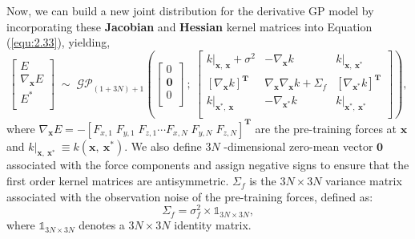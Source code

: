 Now, we can build a new joint distribution for the derivative GP model by incorporating these \textbf{Jacobian} and \textbf{Hessian} kernel matrices into Equation (\ref{equ:2.33}), yielding,
\begin{equation}
    \label{equ:2.41}
         \begin{bmatrix}
         E\\
         \nabla_{\mathbf{x}} E\\
         E^{*}\\
         \end{bmatrix}
        \;\mathtt{\sim}\;
        \mathcal{GP}_{(1+3N)+1}\left(
        \begin{bmatrix}
         0\\
         \mathbf{0}\\
         0\\
         \end{bmatrix}\:
         ;\:\begin{bmatrix}
             k|_{\mathbf{x},\:\mathbf{x}}+\sigma^{2} & -\nabla_{\mathbf{x}} k & k|_{\mathbf{x},\:\mathbf{x}^{*}}\\
             \left[\nabla_{\mathbf{x}} k\right]^{\textbf{T}}  & \nabla_{\mathbf{x}}\nabla_{\mathbf{x}} k +\Sigma_{f}& \left[\nabla_{\mathbf{x}^{*}} k\right]^{\textbf{T}} \\
             k|_{\mathbf{x}^{*},\:\mathbf{x}} & -\nabla_{\mathbf{x}^{*}} k & k|_{\mathbf{x}^{*},\:\mathbf{x}^{*}}\\
         \end{bmatrix}\right),
\end{equation}  
where $\nabla_{\mathbf{x}} E = -\left[F_{x,1}\;F_{y,1}\;F_{z,1}\cdots F_{x,N}\;F_{y,N}\;F_{z,N} \right]^{\mathbf{T}}$ are the pre-training forces at $\mathbf{x}$ and $k|_{\mathbf{x},\:\mathbf{x}^{*}} ~\equiv k(\mathbf{x},\:\mathbf{x}^{*})$.
We also define $3N$ -dimensional zero-mean vector $\mathbf{0}$ associated with the force components and assign negative signs to ensure that the first order kernel matrices are antisymmetric.
$\Sigma_{f}$ is the $3N \times 3N$ variance matrix associated with the observation noise of the pre-training forces, defined as:
\begin{equation}
    \label{equ:2.42}
        \Sigma_{f} = \sigma^{2}_{f}\times\mathbb{1}_{3N \times 3N},
\end{equation} 
where $\mathbb{1}_{3N \times 3N}$ denotes a $3N \times 3N$ identity matrix.

